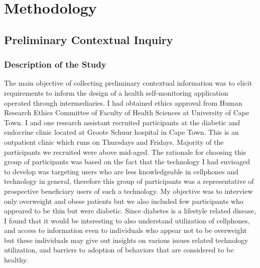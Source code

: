 
\chapter{Methodology} %

\label{methodologychapter} %


\section{Preliminary Contextual Inquiry}
\subsection{Description of the Study}
The main objective of collecting preliminary contextual information was to elicit requirements to inform the design of a health self-monitoring application operated through intermediaries.  I had obtained ethics approval from Human Research Ethics Committee of Faculty of Health Sciences at University of Cape Town. I and one research assistant recruited participants at the diabetic and endocrine clinic located at Groote Schuur hospital in Cape Town. This is an outpatient clinic which runs on Thursdays and Fridays.\newline
Majority of the participants we recruited were above mid-aged. The rationale for choosing this group of participants was based on the fact that the technology I had envisaged to develop was targeting users who are less knowledgeable in cellphones and technology in general, therefore this group of participants was a representative of prospective beneficiary users of such a technology. My objective was to interview only overweight and obese patients but we also included few participants who appeared to be thin but were diabetic. Since diabetes is a lifestyle related disease, I found that it would be interesting to also understand utilization of cellphones, and access to information even to individuals who appear not to be overweight but these individuals may give out insights on various issues related technology utilization, and barriers to adoption of behaviors that are considered to be healthy.\newline
